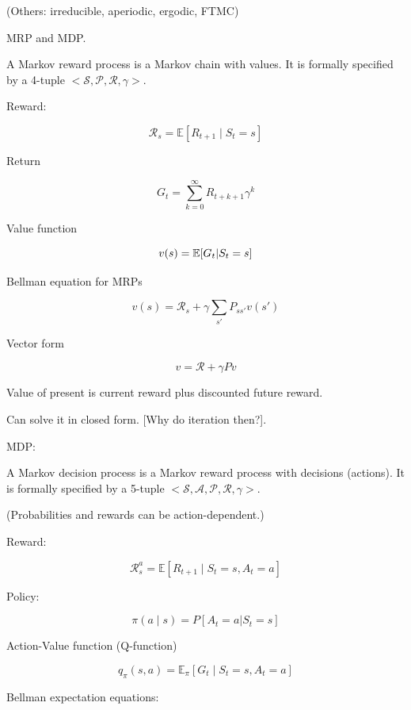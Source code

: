 \documentclass[english]{article}
\begin{document}
(Others: irreducible, aperiodic, ergodic, FTMC)



\item {MRP and MDP}.
\begin{definition}
A Markov reward process is a Markov chain with values. It is formally specified by a 4-tuple $<\mathcal{S}, \mathcal{P}, \mathcal{R}, \gamma>$.

\end{definition}

Reward:

$$
\mathcal{R}_{s} = \mathbb{E}[R_{t+1} \mid S_t = s]
$$

Return 

$$
G_t = \sum_{k=0}^\infty R_{t+k+1}\gamma^k
$$

Value function 

$$
v(s)=
\mathbb{E}[G_t|S_t=s]
$$

\item Bellman equation for MRPs

$$
v(s) = \mathcal{R}_{s} + \gamma \sum_{s'} P_{ss'}v(s')
$$

Vector form

$$
v = \mathcal{R} + \gamma Pv
$$

Value of present is current reward plus discounted future reward. 

Can solve it in closed form. [Why do iteration then?].

\item MDP:

\begin{definition}
A Markov decision process is a Markov reward process with decisions (actions). It is formally specified by a 5-tuple $<\mathcal{S}, \mathcal{A}, \mathcal{P}, \mathcal{R}, \gamma>$.

(Probabilities and rewards can be action-dependent.)
\end{definition}


Reward:

$$
\mathcal{R}_{s}^a = \mathbb{E}[R_{t+1} \mid S_t = s, A_t=a]
$$

Policy: 

$$\pi(a\mid s) = P[A_t = a|S_t = s]$$ 

Action-Value function (Q-function)

$$
q_\pi(s,a) 
= \mathbb{E}_\pi[G_t\mid S_t = s, A_t=a]
$$

Bellman expectation equations:
\end{document}
